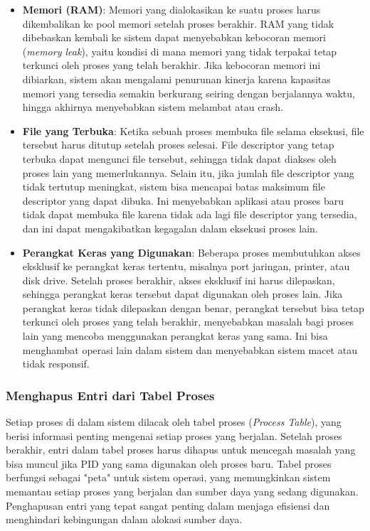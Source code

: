 \documentclass[12pt]{article}
\begin{document}
\begin{itemize}
    \item \textbf{Memori (RAM)}: Memori yang dialokasikan ke suatu proses harus dikembalikan ke pool memori setelah proses berakhir. RAM yang tidak dibebaskan kembali ke sistem dapat menyebabkan kebocoran memori (\textit{memory leak}), yaitu kondisi di mana memori yang tidak terpakai tetap terkunci oleh proses yang telah berakhir. Jika kebocoran memori ini dibiarkan, sistem akan mengalami penurunan kinerja karena kapasitas memori yang tersedia semakin berkurang seiring dengan berjalannya waktu, hingga akhirnya menyebabkan sistem melambat atau crash.
    
    \item \textbf{File yang Terbuka}: Ketika sebuah proses membuka file selama eksekusi, file tersebut harus ditutup setelah proses selesai. File descriptor yang tetap terbuka dapat mengunci file tersebut, sehingga tidak dapat diakses oleh proses lain yang memerlukannya. Selain itu, jika jumlah file descriptor yang tidak tertutup meningkat, sistem bisa mencapai batas maksimum file descriptor yang dapat dibuka. Ini menyebabkan aplikasi atau proses baru tidak dapat membuka file karena tidak ada lagi file descriptor yang tersedia, dan ini dapat mengakibatkan kegagalan dalam eksekusi proses lain.
    
    \item \textbf{Perangkat Keras yang Digunakan}: Beberapa proses membutuhkan akses eksklusif ke perangkat keras tertentu, misalnya port jaringan, printer, atau disk drive. Setelah proses berakhir, akses eksklusif ini harus dilepaskan, sehingga perangkat keras tersebut dapat digunakan oleh proses lain. Jika perangkat keras tidak dilepaskan dengan benar, perangkat tersebut bisa tetap terkunci oleh proses yang telah berakhir, menyebabkan masalah bagi proses lain yang mencoba menggunakan perangkat keras yang sama. Ini bisa menghambat operasi lain dalam sistem dan menyebabkan sistem macet atau tidak responsif.
\end{itemize}

\subsubsection{Menghapus Entri dari Tabel Proses}
Setiap proses di dalam sistem dilacak oleh tabel proses (\textit{Process Table}), yang berisi informasi penting mengenai setiap proses yang berjalan. Setelah proses berakhir, entri dalam tabel proses harus dihapus untuk mencegah masalah yang bisa muncul jika PID yang sama digunakan oleh proses baru. Tabel proses berfungsi sebagai "peta" untuk sistem operasi, yang memungkinkan sistem memantau setiap proses yang berjalan dan sumber daya yang sedang digunakan. Penghapusan entri yang tepat sangat penting dalam menjaga efisiensi dan menghindari kebingungan dalam alokasi sumber daya.
\end{document}
